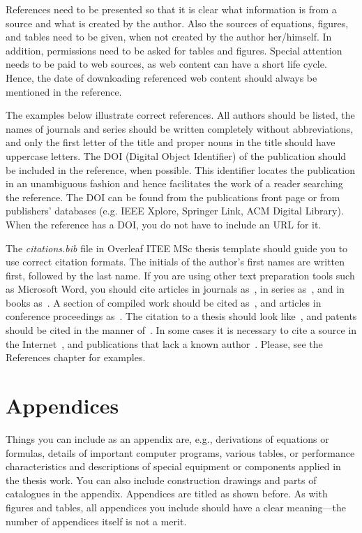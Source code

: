 References need to be presented so that it is clear what information
is from a source and what is created by the author. Also the sources
of equations, figures, and tables need to be given, when not created
by the author her/himself. In addition, permissions need to be asked
for tables and figures. Special attention needs to be paid to web
sources, as web content can have a short life cycle. Hence, the date
of downloading referenced web content should always be mentioned in
the reference.

The examples below illustrate correct references. All authors should
be listed, the names of journals and series should be written
completely without abbreviations, and only the first letter of the
title and proper nouns in the title should have uppercase letters. The
DOI (Digital Object Identifier) of the publication should be included
in the reference, when possible. This identifier locates the
publication in an unambiguous fashion and hence facilitates the work
of a reader searching the reference. The DOI can be found from the
publications front page or from publishers’ databases (e.g. IEEE
Xplore, Springer Link, ACM Digital Library). When the reference has a
DOI, you do not have to include an URL for it.

The \textit{citations.bib} file in Overleaf ITEE MSc thesis template should guide you to use correct citation formats. The initials of the author's first names are written first, followed by the last name. If you are using other text preparation tools such as Microsoft Word, you should cite articles in journals  as~\cite{ojala:2002}, in series as~\cite{riekki:1998}, and in books as~\cite[p. 55]{pietikainen:2011}. A section of compiled work should be cited as~\cite{cvejic:2005}, and articles in conference proceedings as~\cite{heikkila:1997}. The citation to a thesis should look like~\cite{heikkinen:2011}, and patents should be cited in the manner of~\cite{toivonen:2004}. In some cases it is necessary to cite a source in the Internet~\cite{korpela}, and publications that lack a known author~\cite{asuntoliitto_asumistaso_1969}. Please, see the References chapter for examples.

\section{Appendices}
\label{sec:appendices}
Things you can include as an appendix are, e.g., derivations of equations or formulas, details of important computer programs, various tables, or performance characteristics and descriptions of special equipment or components applied in the thesis work. You can also include construction drawings and parts of catalogues in the appendix. Appendices are titled as shown before. As with figures and tables, all appendices you include should have a clear meaning---the number of appendices itself is not a merit.

